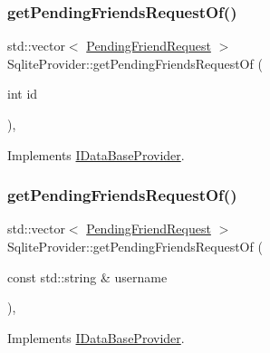 \subsubsection{\texorpdfstring{get\+Pending\+Friends\+Request\+Of()}{getPendingFriendsRequestOf()}\hspace{0.1cm}{\footnotesize\ttfamily [1/2]}}
{\footnotesize\ttfamily std\+::vector$<$ \mbox{\hyperlink{structPendingFriendRequest}{Pending\+Friend\+Request}} $>$ Sqlite\+Provider\+::get\+Pending\+Friends\+Request\+Of (\begin{DoxyParamCaption}\item[{int}]{id }\end{DoxyParamCaption})\hspace{0.3cm}{\ttfamily [override]}, {\ttfamily [virtual]}}



Implements \mbox{\hyperlink{classIDataBaseProvider_ad30f529c809222d72f94d15de95d44b2}{I\+Data\+Base\+Provider}}.

\mbox{\label{classSqliteProvider_a82dcdc27e96ff8bfe63989af3e6eff62}} 
\subsubsection{\texorpdfstring{get\+Pending\+Friends\+Request\+Of()}{getPendingFriendsRequestOf()}\hspace{0.1cm}{\footnotesize\ttfamily [2/2]}}
{\footnotesize\ttfamily std\+::vector$<$ \mbox{\hyperlink{structPendingFriendRequest}{Pending\+Friend\+Request}} $>$ Sqlite\+Provider\+::get\+Pending\+Friends\+Request\+Of (\begin{DoxyParamCaption}\item[{const std\+::string \&}]{username }\end{DoxyParamCaption})\hspace{0.3cm}{\ttfamily [override]}, {\ttfamily [virtual]}}



Implements \mbox{\hyperlink{classIDataBaseProvider_a376d53c78f3e101b9c0e4540330cce5b}{I\+Data\+Base\+Provider}}.

